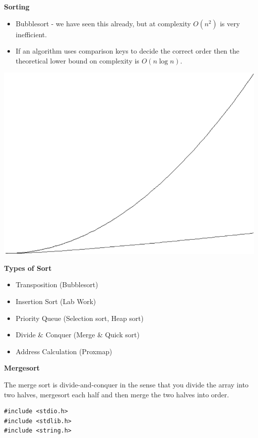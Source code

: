 \documentclass[a4,portraitt]{slides}
\begin{document}
{\newpage
{\samepage
\begin{center}
{\Large{\bf Sorting}}
\end{center}
\begin{itemize}
\item Bubblesort - we have seen this already, but at complexity $O(n^2)$ is
very inefficient.
\item If an algorithm uses comparison keys to decide the correct order
then the theoretical lower bound on complexity is $O(n \log n )$.
\end{itemize}
\begin{center}
\includegraphics{../Images/nlogn.pdf}
\end{center}

}

\newpage
{\samepage
\begin{center}
{\Large{\bf Types of Sort}}
\end{center}
\begin{itemize}
\item Transposition (Bubblesort)
\item Insertion Sort (Lab Work)
\item Priority Queue (Selection sort, Heap sort)
\item Divide \& Conquer (Merge \& Quick sort)
\item Address Calculation (Proxmap)
\end{itemize}
}

\newpage
{\samepage
\begin{center}
{\Large{\bf Mergesort}}
\end{center}
The merge sort is divide-and-conquer in the sense that you
divide the array into two halves, mergesort each half and
then merge the two halves into order.
{\small
\begin{verbatim}
#include <stdio.h>
#include <stdlib.h>
#include <string.h>


\end{verbatim}}}}
\end{document}
